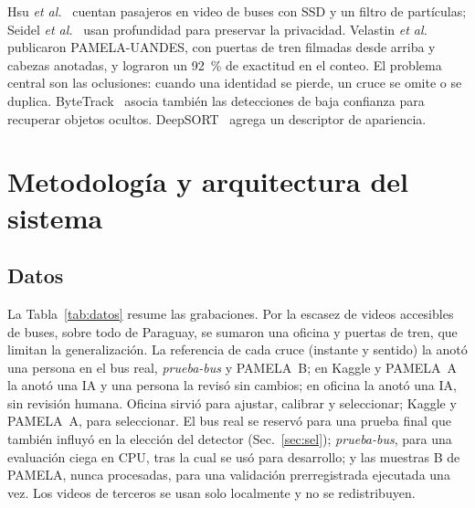 \documentclass[conference,a4paper]{IEEEtran}
\begin{document}
Hsu \emph{et al.}~\cite{hsu2020} cuentan pasajeros en video de buses con SSD y un filtro de partículas; Seidel \emph{et al.}~\cite{seidel2022} usan profundidad para preservar la privacidad. Velastin \emph{et al.}~\cite{velastin2020} publicaron PAMELA-UANDES, con puertas de tren filmadas desde arriba y cabezas anotadas, y lograron un 92~\% de exactitud en el conteo. El problema central son las oclusiones: cuando una identidad se pierde, un cruce se omite o se duplica. ByteTrack~\cite{zhang2022} asocia también las detecciones de baja confianza para recuperar objetos ocultos. DeepSORT~\cite{wojke2017} agrega un descriptor de apariencia.

\section{Metodología y arquitectura del sistema}
\subsection{Datos}
La Tabla~\ref{tab:datos} resume las grabaciones. Por la escasez de videos accesibles de buses, sobre todo de Paraguay, se sumaron una oficina y puertas de tren, que limitan la generalización. La referencia de cada cruce (instante y sentido) la anotó una persona en el bus real, \emph{prueba-bus} y PAMELA~B; en Kaggle y PAMELA~A la anotó una IA y una persona la revisó sin cambios; en oficina la anotó una IA, sin revisión humana. Oficina sirvió para ajustar, calibrar y seleccionar; Kaggle y PAMELA~A, para seleccionar. El bus real se reservó para una prueba final que también influyó en la elección del detector (Sec.~\ref{sec:sel}); \emph{prueba-bus}, para una evaluación ciega en CPU, tras la cual se usó para desarrollo; y las muestras B de PAMELA, nunca procesadas, para una validación prerregistrada ejecutada una vez. Los videos de terceros se usan solo localmente y no se redistribuyen.
\end{document}

